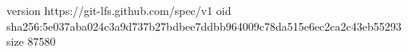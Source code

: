 version https://git-lfs.github.com/spec/v1
oid sha256:5e037aba024c3a9d737b27bdbee7ddbb964009c78da515e6ec2ca2c43eb55293
size 87580
